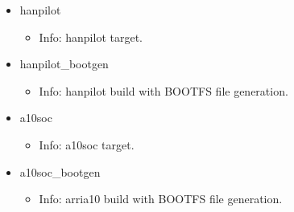 \begin{itemize}
\item hanpilot
	\begin{itemize}
	\item[$\space$] Info: hanpilot target.
	\end{itemize}
\item hanpilot\_bootgen
	\begin{itemize}
	\item[$\space$] Info: hanpilot build with BOOTFS file generation.
	\end{itemize}
\item a10soc
	\begin{itemize}
	\item[$\space$] Info: a10soc target.
	\end{itemize}
\item a10soc\_bootgen
	\begin{itemize}
	\item[$\space$] Info: arria10 build with BOOTFS file generation.
	\end{itemize}
\end{itemize}
